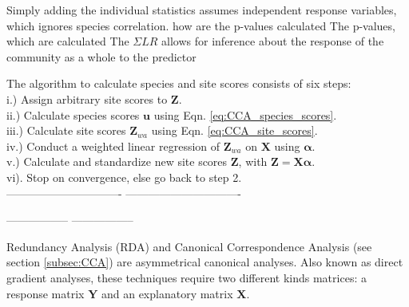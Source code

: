  
 Simply adding the individual statistics assumes independent response variables, which ignores species correlation. 
  how are the p-values calculated 
 The p-values, which are calculated    
 The $\Sigma LR$ allows for inference about the response of the community as a whole to the predictor
 
 	The algorithm to calculate species and site scores consists of six steps:\\
 	 i.) Assign arbitrary site scores to $\mathbf{Z}$. \\
 	 ii.) Calculate species scores $\mathbf{u}$ using Eqn. \ref{eq:CCA_species_scores}.\\
 	iii.) Calculate site scores $\mathbf{Z}_{wa}$ using Eqn. \ref{eq:CCA_site_scores}.\\
 	iv.) Conduct a weighted linear regression of $\mathbf{Z}_{wa}$ on $\mathbf{X}$ using $\mathbf{\alpha}$.\\
 	v.) Calculate and standardize new site scores $\mathbf{Z}$, with $\mathbf{Z} = \mathbf{X} \mathbf{\alpha}$.\\
 	vi). Stop on convergence, else go back to step 2.\\
 
 
 -------------------------------%
 -------------------------------%
 
 -----------------%
 -----------------%
 
 	Redundancy Analysis (RDA) \citep{rao1964use} and Canonical Correspondence Analysis (see section \ref{subsec:CCA}) are asymmetrical canonical analyses. Also known as direct gradient analyses, these techniques require two different kinds matrices: a response matrix $\mathbf{Y}$ and an explanatory matrix $\mathbf{X}$.
 
 
